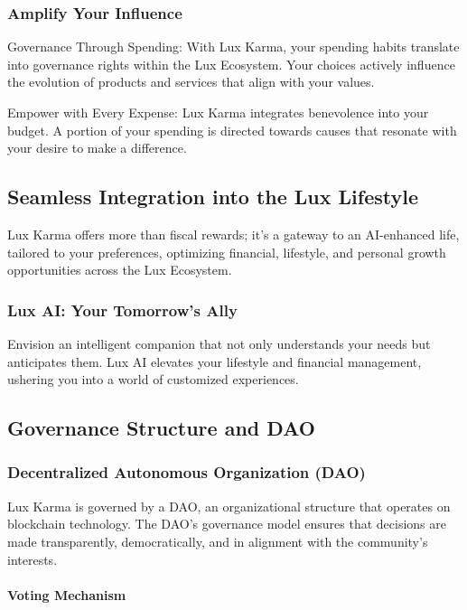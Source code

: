 \documentclass[11pt]{article}
\begin{document}
\subsubsection{Amplify Your Influence}

Governance Through Spending: With Lux Karma, your spending habits translate into governance rights within the Lux Ecosystem. Your choices actively influence the evolution of products and services that align with your values.


Empower with Every Expense: Lux Karma integrates benevolence into your budget. A portion of your spending is directed towards causes that resonate with your desire to make a difference.


\subsection{Seamless Integration into the Lux Lifestyle}

Lux Karma offers more than fiscal rewards; it's a gateway to an AI-enhanced life, tailored to your preferences, optimizing financial, lifestyle, and personal growth opportunities across the Lux Ecosystem.


\subsubsection{Lux AI: Your Tomorrow's Ally}

Envision an intelligent companion that not only understands your needs but anticipates them. Lux AI elevates your lifestyle and financial management, ushering you into a world of customized experiences.


\subsection{Governance Structure and DAO}

\subsubsection{Decentralized Autonomous Organization (DAO)}

Lux Karma is governed by a DAO, an organizational structure that operates on blockchain technology. The DAO's governance model ensures that decisions are made transparently, democratically, and in alignment with the community's interests.


\paragraph{Voting Mechanism}
\end{document}
